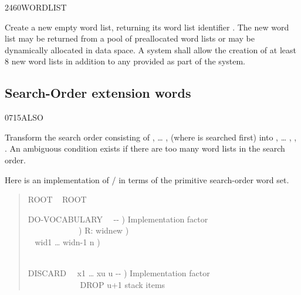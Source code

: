 \begin{worddef}{2460}{WORDLIST}
\item {}

	Create a new empty word list, returning its word list identifier
	. The new word list may be returned from a pool of
	preallocated word lists or may be dynamically allocated in data
	space. A system shall allow the creation of at least 8 new word
	lists in addition to any provided as part of the system.
\end{worddef}


\subsection{Search-Order extension words} %
\extended

\begin{worddef}{0715}{ALSO}
\item \stack{}{}

	Transform the search order consisting of , {\ldots}
	,  (where  is searched
	first) into , {\ldots} , ,
	. An ambiguous condition exists if there are too
	many word lists in the search order.

\see {}

	\begin{rationale} %
		Here is an implementation of / in terms
		of the primitive search-order word set.
		\begin{quote}\ttfamily
		  ROOT ~
		ROOT 

		\word{:} DO-VOCABULARY~~ -{}- )
			 Implementation factor \\
		\tab{}~~ 
				~~~~~~~~~\word{p} )  R: widnew ) \\
		\tab~  
				 wid1 {\ldots} widn-1 n ) \\
		\tab~   \\
		\word{;}

		\word{:} DISCARD~~ x1 {\ldots} xu u -{}- )
			 Implementation factor \\
		   
			~~~~~~~~~~~~ DROP u+1 stack items \\
		\word{;}


\end{quote}
\end{rationale}
\end{worddef}
